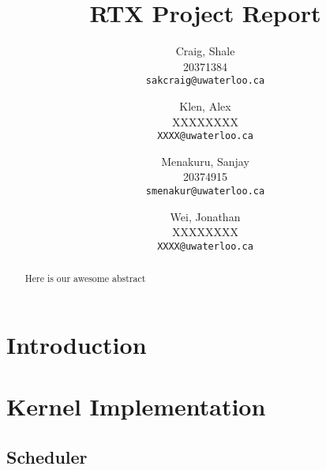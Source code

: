 \documentclass[12pt]{report}
\begin{document}

\title{RTX Project Report}

\author{
    Craig, Shale\\
    20371384\\
    \texttt{sakcraig@uwaterloo.ca}
    \and
    Klen, Alex\\
    XXXXXXXX\\
    \texttt{XXXX@uwaterloo.ca}
    \and
    Menakuru, Sanjay\\
    20374915\\
    \texttt{smenakur@uwaterloo.ca}
    \and
    Wei, Jonathan\\
    XXXXXXXX\\
    \texttt{XXXX@uwaterloo.ca}
}

\maketitle

\begin{abstract}
    Here is our awesome abstract
\end{abstract}

\tableofcontents
\listofalgorithms



\part{Introduction}

\part{Kernel Implementation}

\chapter{Scheduler}
\end{document}
